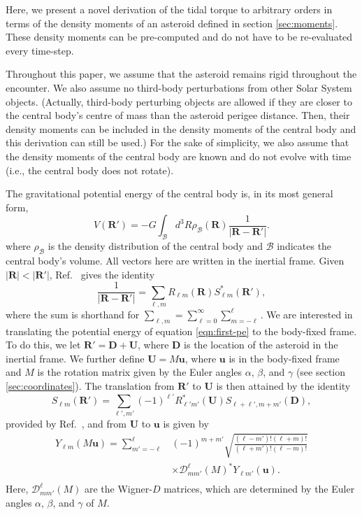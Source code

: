 \documentclass[fleqn,usenatbib]{mnras}
\begin{document}
Here, we present a novel derivation of the tidal torque to arbitrary orders in terms of the density moments of an asteroid defined in section \ref{sec:moments}. These density moments can be pre-computed and do not have to be re-evaluated every time-step.

Throughout this paper, we assume that the asteroid remains rigid throughout the encounter. We also assume no third-body perturbations from other Solar System objects. (Actually, third-body perturbing objects are allowed if they are closer to the central body's centre of mass than the asteroid perigee distance. Then, their density moments can be included in the density moments of the central body and this derivation can still be used.) For the sake of simplicity, we also assume that the density moments of the central body are known and do not evolve with time (i.e., the central body does not rotate).

The gravitational potential energy of the central body is, in its most general form,
\begin{equation}
V(\bm R') = -G\int_\mathcal{B} d^3 R \rho_\mathcal{B}(\bm R) \frac{1}{|\bm{R}-\bm{R'}|}.
\label{eqn:first-pe}
\end{equation}
where $\rho_\mathcal{B}$ is the density distribution of the central body and $\mathcal{B}$ indicates the central body's volume. All vectors here are written in the inertial frame. Given $|\bm{R}| < |\bm{R'}|$, Ref.~\cite{Gelderen1998TheSO} gives the identity
\begin{equation}
  \frac{1}{|\bm R - \bm R'|} = \sum_{\ell, m} R_{\ell m}(\bm R) S_{\ell m}^*(\bm R'),
  \label{eqn:ylm-expansion}
\end{equation}
where the sum is shorthand for $\sum_{\ell, m} = \sum_{\ell = 0}^\infty \sum_{m=-\ell}^\ell$.
We are interested in translating the potential energy of equation \ref{eqn:first-pe} to the body-fixed frame. To do this, we let $\bm{R'} = \bm D + \bm U$, where $\bm D$ is the location of the asteroid in the inertial frame. We further define $\bm U = M\bm u$, where $\bm u$ is in the body-fixed frame and $M$ is the rotation matrix given by the Euler angles $\alpha$, $\beta$, and $\gamma$ (see section \ref{sec:coordinates}). The translation from $\bm {R'}$ to $\bm U$ is then attained by the identity 
\begin{equation}
  S_{\ell m}(\bm R') = \sum_{\ell', m'} (-1)^{\ell'}R^*_{\ell' m'}(\bm U)S_{\ell+\ell', m + m'} (\bm D),
  \label{eqn:ylm-translation}
\end{equation}  
provided by Ref.~\cite{Gelderen1998TheSO}, and from $\bm U$ to $\bm u$ is given by
\begin{equation}
  \begin{split}
    Y_{\ell m}(M\bm u) = \sum_{m'=-\ell}^\ell & (-1)^{m+m'}\sqrt{\frac{(\ell-m')!(\ell+m)!}{(\ell+m')!(\ell-m)!}} \\
    & \times \mathcal{D}^\ell_{mm'}(M)^* Y_{\ell m'}(\bm u).\\
  \end{split}
  \label{eqn:ylm-rotation}
\end{equation}
Here, $\mathcal{D}^\ell_{mm'}(M)$ are the Wigner-$D$ matrices, which are determined by the Euler angles $\alpha$, $\beta$, and $\gamma$ of $M$.
\end{document}
